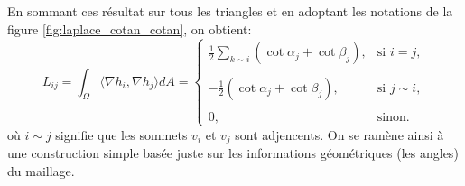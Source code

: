 En sommant ces résultat sur tous les triangles et en adoptant les notations de la figure \ref{fig:laplace_cotan_cotan}, on obtient:
\[
L_{ij} =\displaystyle\int_\Omega \langle \nabla h_i, \nabla h_j \rangle dA=
\begin{cases}
\displaystyle\frac{1}{2} \sum_{k\sim i} (\cot \alpha_j + \cot \beta_j), & \text{si } i = j, \\\\
-\displaystyle\frac{1}{2} (\cot \alpha_j + \cot \beta_j), & \text{si } j \sim i, \\\\
0, & \text{sinon}.
\end{cases}
\]
où $i \sim j$ signifie que les sommets $v_i$ et $v_j$ sont adjencents. On se ramène ainsi à une construction simple basée juste sur les informations géométriques (les angles) du maillage.



